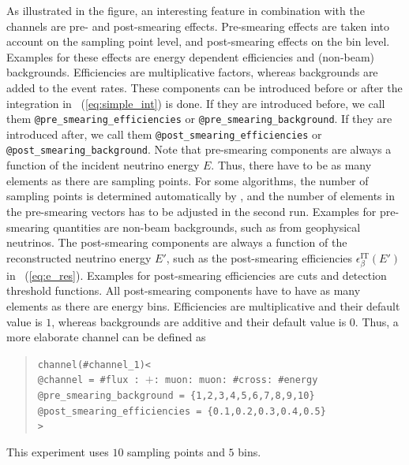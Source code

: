 As illustrated in the figure, an interesting feature in combination with the
channels are pre- and post-smearing effects. Pre-smearing effects are taken into account on the sampling point level, and post-smearing effects on the bin level. Examples for these effects are energy 
dependent efficiencies and (non-beam) backgrounds. Efficiencies are multiplicative factors, whereas backgrounds are added to the event rates. These components can be introduced before or after the integration in \eq~(\ref{eq:simple_int}) is done. 
%
%
If they are introduced before, 
we call them
{\tt @pre\_smearing\_efficiencies} or {\tt @pre\_smearing\_background}. 
If they are introduced after, we call them {\tt @post\_smearing\_efficiencies} or {\tt @post\_smearing\_background}.
Note that pre-smearing components are always a function of the incident neutrino energy $E$. Thus, there have to be as  many elements as there are sampling points. For some algorithms, the number of sampling points is determined automatically by \GLOBES , and the number of elements in the  pre-smearing vectors has to be adjusted in the second run.
Examples for pre-smearing quantities are non-beam backgrounds, such as from geophysical neutrinos. The post-smearing components are always a function of the reconstructed neutrino energy $E'$, such as the post-smearing efficiencies $\epsilon_\beta^{\text{IT}}(E')$ in \eq~(\ref{eq:e_res}). Examples for post-smearing efficiencies are cuts and detection threshold functions. All post-smearing components have to have as 
many elements as there are energy bins. Efficiencies are multiplicative 
and their default value is $1$, whereas backgrounds are additive and their default value is $0$. Thus, a more elaborate channel can be defined as
\begin{quote}
{\tt channel(\#channel\_1)<\\
\tb @channel = \#flux : $+$: muon: muon: \#cross: \#energy\\
\tb @pre\_smearing\_background = \{1,2,3,4,5,6,7,8,9,10\}\\
\tb @post\_smearing\_efficiencies = \{0.1,0.2,0.3,0.4,0.5\}\\
>}
\end{quote}
%
%
This experiment uses $10$ sampling points and $5$ bins.

